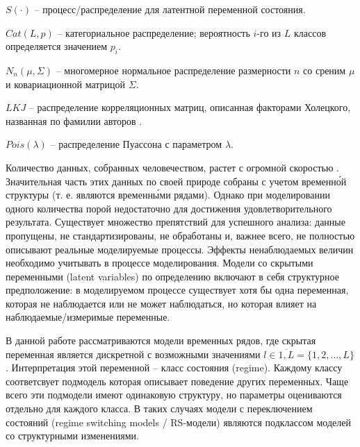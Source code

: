\documentclass[a4paper,14pt]{extreport}
\begin{document}
$S(\cdot)$ -- процесс/распределение для латентной переменной состояния.

$\mathit{Cat}(L, p)$ -- категориальное распределение; вероятность $i$-го из $L$ классов определяется значением $p_i$.

$N_n(\mu, \Sigma)$ -- многомерное нормальное распределение размерности $n$ со среним $\mu$ и ковариационной матрицой $\Sigma$.

$\mathit{LKJ}$ -- распределение корреляционных матриц, описанная факторами Холецкого, названная по фамилии авторов \cite{lkj_prior}. 

$\mathit{Pois}(\lambda)$ -- распределение Пуассона с параметром $\lambda$.




Количество данных, собранных человечеством, растет с огромной скоростью \cite{idc_data_2025}. Значительная часть этих данных по своей природе собраны с учетом временн\'{о}й структуры (т. е. являются временн\'{ы}ми рядами). Однако при моделировании одного количества порой недостаточно для достижения удовлетворительного результата. Существует множество препятствий для успешного анализа: данные пропущены, не стандартизированы, не обработаны и, важнее всего, не полностью описывают реальные моделируемые процессы. Эффекты ненаблюдаемых величин необходимо учитывать в процессе моделирования. Модели со скрытыми переменными (latent variables) по определению включают в себя структурное предположение: в моделируемом процессе существует хотя бы одна переменная, которая не наблюдается или не может наблюдаться, но которая влияет на наблюдаемые/измеримые переменные.

В данной работе рассматриваются модели временных рядов, где скрытая переменная является дискретной с возможными значениями $l \in \overline{1,L} = \{1,2,\dots,L\}$. Интерпретация этой переменной -- класс состояния (regime). Каждому классу соответсвует подмодель которая описывает поведение других переменных. Чаще всего эти подмодели имеют одинаковую структуру, но параметры оцениваются отдельно для каждого класса. В таких случаях модели с переключением состояний (regime switching models / RS-модели) являются подклассом моделей со структурными изменениями.
\end{document}
